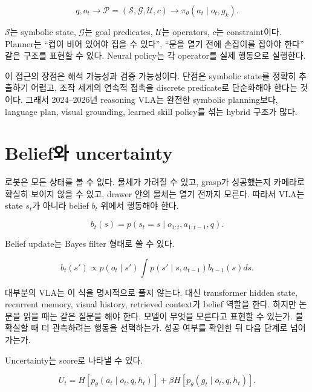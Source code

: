 \begin{equation}
  q,o_t
  \rightarrow
  \mathcal{P}
  =
  \left(
    \mathcal{S},
    \mathcal{G},
    \mathcal{U},
    c
  \right)
  \rightarrow
  \pi_\theta(a_t \mid o_t,g_k).
\end{equation}

$\mathcal{S}$는 symbolic state, $\mathcal{G}$는 goal predicates, $\mathcal{U}$는 operators, $c$는 constraint이다. Planner는 ``컵이 비어 있어야 집을 수 있다'', ``문을 열기 전에 손잡이를 잡아야 한다'' 같은 구조를 표현할 수 있다. Neural policy는 각 operator를 실제 행동으로 실행한다.

이 접근의 장점은 해석 가능성과 검증 가능성이다. 단점은 symbolic state를 정확히 추출하기 어렵고, 조작 세계의 연속적 접촉을 discrete predicate로 단순화해야 한다는 것이다. 그래서 2024--2026년 reasoning VLA는 완전한 symbolic planning보다, language plan, visual grounding, learned skill policy를 섞는 hybrid 구조가 많다.

\section{Belief와 uncertainty}

로봇은 모든 상태를 볼 수 없다. 물체가 가려질 수 있고, grasp가 성공했는지 카메라로 확실히 보이지 않을 수 있고, drawer 안의 물체는 열기 전까지 모른다. 따라서 VLA는 state $s_t$가 아니라 belief $b_t$ 위에서 행동해야 한다.

\begin{equation}
  b_t(s)
  =
  p(s_t=s \mid o_{1:t},a_{1:t-1},q).
\end{equation}

Belief update는 Bayes filter 형태로 쓸 수 있다.

\begin{equation}
  b_t(s')
  \propto
  p(o_t \mid s')
  \int
  p(s' \mid s,a_{t-1})
  b_{t-1}(s)
  ds.
\end{equation}

대부분의 VLA는 이 식을 명시적으로 풀지 않는다. 대신 transformer hidden state, recurrent memory, visual history, retrieved context가 belief 역할을 한다. 하지만 논문을 읽을 때는 같은 질문을 해야 한다. 모델이 무엇을 모른다고 표현할 수 있는가. 불확실할 때 더 관측하려는 행동을 선택하는가. 성공 여부를 확인한 뒤 다음 단계로 넘어가는가.

Uncertainty는 score로 나타낼 수 있다.

\begin{equation}
  U_t
  =
  H\left[p_\theta(a_t \mid o_t,q,h_t)\right]
  +
  \beta
  H\left[p_\theta(g_t \mid o_t,q,h_t)\right].
\end{equation}

